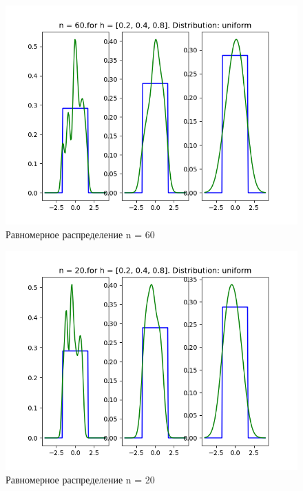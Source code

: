 \documentclass[a4]{article}
\begin{document}
\begin{center}
\begin{figure}[h!]
			\includegraphics[width=\textwidth]{uniformker60.png}
			\caption[Равномерное распределение n = 60]{Равномерное распределение n = 60}
		\end{figure}
		\newpage
		\begin{figure}[h!]
			\includegraphics[width=\textwidth]{uniformker20.png}
			\caption[Равномерное распределение n = 20]{Равномерное распределение n = 20}
		\end{figure}
		\newpage
		\begin{figure}[h!]

\end{figure}
\end{center}
\end{document}
